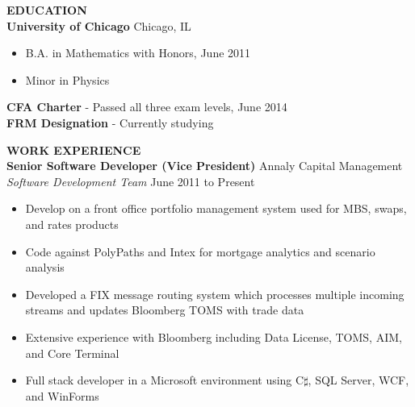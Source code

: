 \documentclass{article}
\begin{document}

\begin{flushleft}

\textbf{EDUCATION}\\
\hspace{20pt}
\textbf{University of Chicago} Chicago, IL
\begin{itemize}[leftmargin=50pt,itemsep=-2pt]
\item B.A. in Mathematics with Honors, June 2011
\item Minor in Physics
\end{itemize}
\hspace{20pt}
\textbf{CFA Charter} - Passed all three exam levels, June 2014\\
\vspace{6pt}
\hspace{20pt}
\textbf{FRM Designation} - Currently studying

\vspace{5pt}
\textbf{WORK EXPERIENCE}\\
\hspace{20pt}
\textbf{Senior Software Developer (Vice President)} \hfill Annaly Capital Management\\
\hspace{20pt}
\textit{Software Development Team} \hfill June 2011 to Present\\
\begin{itemize}[leftmargin=50pt,itemsep=-2pt]
\item Develop on a front office portfolio management system used for MBS, swaps, and rates products
\item Code against PolyPaths and Intex for mortgage analytics and scenario analysis
\item Developed a FIX message routing system which processes multiple incoming streams and updates Bloomberg TOMS with trade data
\item Extensive experience with Bloomberg including Data License, TOMS, AIM, and Core Terminal
\item Full stack developer in a Microsoft environment using C$\sharp$, SQL Server, WCF, and WinForms
\end{itemize}
 

\end{flushleft}
\end{document}
